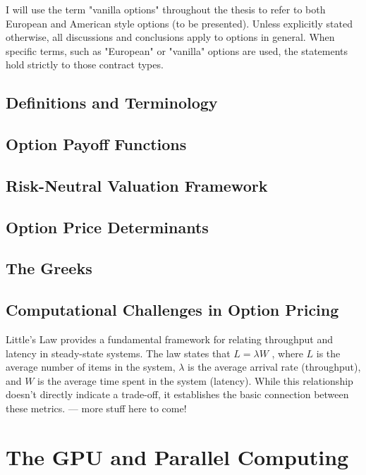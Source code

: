 \documentclass[english,12pt,a4paper,pdftex,sci,utf8]{aaltothesis}
\begin{document}
I will use the term "vanilla options" throughout the thesis to refer to both European and American style options (to be presented). Unless explicitly stated otherwise, all discussions and conclusions apply to options in general. When specific terms, such as "European" or "vanilla" options are used, the statements hold strictly to those contract types.

\subsection{Definitions and Terminology}

\subsection{Option Payoff Functions}

\subsection{Risk-Neutral Valuation Framework}

\subsection{Option Price Determinants}

\subsection{The Greeks}

\subsection{Computational Challenges in Option Pricing}



Little's Law provides a fundamental framework for relating throughput and latency in steady-state systems. The law states that $L=\lambda W$ , where $L$ is the average number of items in the system, $\lambda$ is the average arrival rate (throughput), and $W$ is the average time spent in the system (latency). While this relationship doesn't directly indicate a trade-off, it establishes the basic connection between these metrics. \bigskip
--- more stuff here to come!


\section{The GPU and Parallel Computing} \label{sec:gpu-computing}
\end{document}
